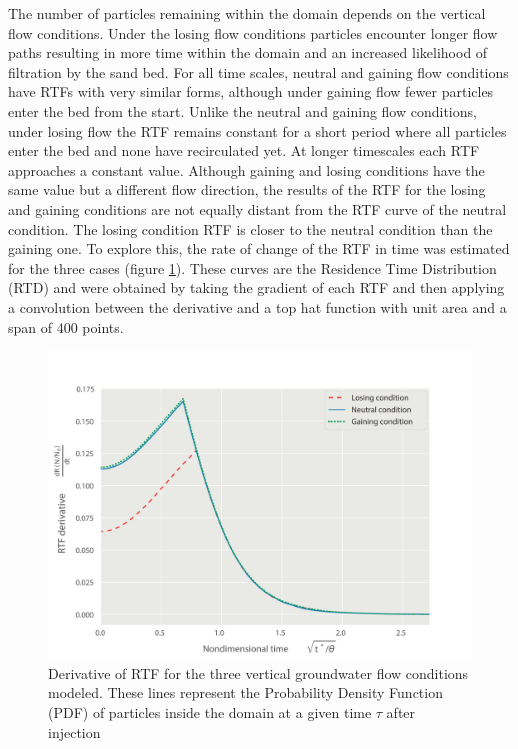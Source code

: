 \documentclass[draft,linenumbers]{agujournal2018}
\begin{document}
The number of particles remaining within the domain depends on the vertical flow conditions. Under the losing flow conditions particles encounter longer flow paths resulting in more time within the domain and an increased likelihood of filtration by the sand bed. For all time scales, neutral and gaining flow conditions have RTFs with very similar forms, although under gaining flow fewer particles enter the bed from the start. Unlike the neutral and gaining flow conditions, under losing flow the RTF remains constant for a short period where all particles enter the bed and none have recirculated yet. At longer timescales each RTF approaches a constant value. Although gaining and losing conditions have the same value but a different flow direction, the results of the RTF for the losing and gaining conditions are not equally distant from the RTF curve of the neutral condition. The losing condition RTF is closer to the neutral condition than the gaining one. To explore this, the rate of change of the RTF in time was estimated for the three cases (figure \ref{RTFder}). These curves are the Residence Time Distribution (RTD) and were obtained by taking the gradient of each RTF and then applying a convolution between the derivative and a top hat function with unit area and a span of $400$ points. 

\begin{figure}[ht]
\centering
\includegraphics[trim=0.2cm 0.2cm 0.2cm 0.2cm, width=35pc]
{190305_RTF_der.pdf}
\caption{Derivative of RTF for the three vertical groundwater flow conditions modeled. These lines represent the Probability Density Function (PDF) of particles inside the domain at a given time $\tau$ after injection}
\label{RTFder}
\end{figure}
\end{document}
